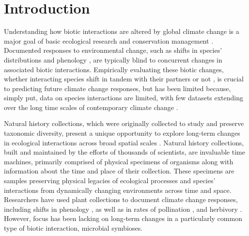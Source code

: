 \documentclass[11pt]{article}
\begin{document}
	\newpage{}
	
	\section*{Introduction}
	
	
Understanding how biotic interactions are altered by global climate change is a major goal of basic ecological research and conservation management \cite{gilman2010framework,blois2013climate}.
Documented responses to environmental change, such as shifts in species' distributions \cite{aitken2008adaptation} and phenology \cite{piao2019plant}, are typically blind to concurrent changes in associated biotic interactions.
Empirically evaluating these biotic changes, whether interacting species shift in tandem with their partners or not \cite{hillerislambers2013will}, is crucial to predicting future climate change responses, but has been limited because, simply put, data on species interactions are limited, with few datasets extending over the long time scales of contemporary climate change \cite{poisot2021global}.


Natural history collections, which were originally collected to study and preserve taxonomic diversity, present a unique opportunity to explore long-term changes in ecological interactions across broad spatial scales \citep{meineke2018unrealized}. 
Natural history collections, built and maintained by the efforts of thousands of scientists, are invaluable time machines, primarily comprised of physical specimens of organisms  along with information about the time and place of their collection. 
These specimens are samples preserving physical legacies of ecological processes and species' interactions from dynamically changing environments across time and space.
Researchers have used plant collections to document climate change responses, including shifts in phenology \citep{willis2017old, park2019herbarium,  berg2019examination}, as well as in rates of pollination \citep{pauw2011reconstruction, duan2019century}, and herbivory \citep{meineke2019herbarium}. However, focus has been lacking on long-term changes in a particularly common type of biotic interaction, microbial symbioses.
\end{document}
